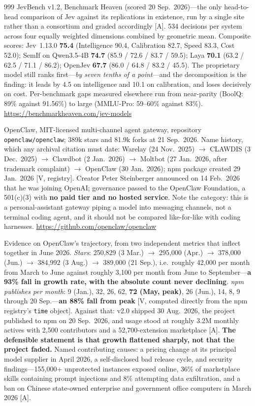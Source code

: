 \begin{thebibliography}{999}
 JevBench v1.2, Benchmark Heaven (scored 20 Sep.\ 2026)---the only head-to-head comparison of Jev against its replications in existence, run by a single site rather than a consortium and graded accordingly [A]. 534 decisions per system across four equally weighted dimensions combined by geometric mean. Composite scores: Jev~1.13.0 \textbf{75.4} (Intelligence 90.4, Calibration 82.7, Speed 83.3, Cost 52.0); SemIf on Qwen3.5-4B \textbf{74.7} (85.9 / 72.6 / 83.7 / 59.5); Laya \textbf{70.1} (63.2 / 62.5 / 71.1 / 86.2); OpenJev \textbf{67.7} (86.0 / 64.8 / 83.2 / 45.5). The proprietary model still ranks first---\emph{by seven tenths of a point}---and the decomposition is the finding: it leads by 4.5 on intelligence and 10.1 on calibration, and loses decisively on cost. Per-benchmark gaps measured elsewhere run from near-parity (BoolQ: 89\% against 91.56\%) to large (MMLU-Pro: 59--60\% against 83\%). \url{https://benchmarkheaven.com/jev-models}

 OpenClaw, MIT-licensed multi-channel agent gateway, repository \texttt{openclaw/openclaw}; 389k stars and 81.9k forks at 21 Sep.\ 2026. Name history, which any archival citation must date: Warelay (24 Nov.\ 2025) $\rightarrow$ CLAWDIS (3 Dec.\ 2025) $\rightarrow$ Clawdbot (2 Jan.\ 2026) $\rightarrow$ Moltbot (27 Jan.\ 2026, after trademark complaint) $\rightarrow$ OpenClaw (30 Jan.\ 2026); npm package created 29 Jan.\ 2026 [V, registry]. Creator Peter Steinberger announced on 14 Feb.\ 2026 that he was joining OpenAI; governance passed to the OpenClaw Foundation, a 501(c)(3) with \textbf{no paid tier and no hosted service}. Note the category: this is a personal-assistant gateway piping a model into messaging channels, not a terminal coding agent, and it should not be compared like-for-like with coding harnesses. \url{https://github.com/openclaw/openclaw}

 Evidence on OpenClaw's trajectory, from two independent metrics that inflect together in June 2026. \emph{Stars}: 250,829 (3 Mar.) $\rightarrow$ 295,000 (Apr.) $\rightarrow$ 378,000 (Jun.) $\rightarrow$ 384,992 (3 Aug.) $\rightarrow$ 389,000 (21 Sep.), i.e.\ roughly 42,000 per month from March to June against roughly 3,100 per month from June to September---\textbf{a 93\% fall in growth rate, with the absolute count never declining}. \emph{npm publishes per month}: 9 (Jan.), 32, 26, 62, \textbf{72 (May, peak)}, 26 (Jun.), 14, 8, 9 through 20 Sep.---\textbf{an 88\% fall from peak} [V, computed directly from the npm registry's \texttt{time} object]. Against that: v2.0 shipped 30 Aug.\ 2026, the project published to npm on 20 Sep.\ 2026, and usage stood at roughly 3.2M monthly actives with 2,500 contributors and a 52,700-extension marketplace [A]. \textbf{The defensible statement is that growth flattened sharply, not that the project faded.} Named contributing causes: a pricing change at its principal model supplier in April 2026, a self-disclosed bad release cycle, and security findings---155,000+ unprotected instances exposed online, 36\% of marketplace skills containing prompt injections and 8\% attempting data exfiltration, and a ban on Chinese state-owned enterprise and government office computers in March 2026 [A].


\end{thebibliography}
